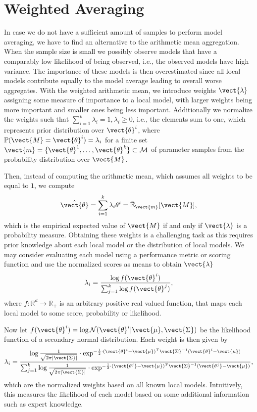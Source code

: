 \section{Weighted Averaging}
In case we do not have a sufficient amount of samples to perform model averaging, we have to find an alternative to the arithmetic mean aggregation. 
When the sample size is small we possibly observe models that have a comparably low likelihood of being observed, i.e., the observed models have high variance. 
The importance of these models is then overestimated since all local models contribute equally to the model average leading to overall worse aggregates.
With the weighted arithmetic mean, we introduce weights $\vect{\lambda}$ assigning some measure of importance to a local model, with larger weights being more important and smaller ones being less important.
Additionally we normalize the weights such that $\sum_{i=1}^k \lambda_i = 1, \lambda_i \geq 0$, i.e., the elements sum to one, which represents prior distribution over $\vect{\theta}^i$, where $\mathbb{P}(\vect{M} = \vect{\theta}^i) = \lambda_i$ for a finite set $\vect{m} = \{\vect{\theta}^1, \ldots, \vect{\theta}^k\} \subset \mathcal{M}$ of parameter samples from the probability distribution over $\vect{M}$.

Then, instead of computing the arithmetic mean, which assumes all weights to be equal to $1$, we compute
\begin{equation}
     \hat{\vect{\theta}} = \sum_{i=1}^k \lambda_i \theta^i = \tilde{\mathbb{E}}_{\vect{m}}[\vect{M}],
\end{equation}
which is the empirical expected value of $\vect{M}$ if and only if $\vect{\lambda}$ is a probability measure.
Obtaining these weights is a challenging task as this requires prior knowledge about each local model or the distribution of local models.
We may consider evaluating each model using a performance metric or scoring function and use the normalized scores as means to obtain $\vect{\lambda}$
\begin{equation}
    \lambda_i = \frac{\log f(\vect{\theta}^i)}{\sum_{j=1}^k \log f(\vect{\theta}^j)},
\end{equation}
where $f: \mathbb{R}^d \rightarrow \mathbb{R}_+$ is an arbitrary positive real valued function, that maps each local model to some score, probability or likelihood.

Now let $f(\vect{\theta}^i) = \log \mathcal{N}(\vect{\theta}^i \lvert \vect{\mu}, \vect{\Sigma})$ be the likelihood function of a secondary normal distribution.
Each weight is then given by
\begin{equation}
    \label{eq:normll}
    \lambda_i = \frac{\log \frac{1}{\sqrt{2\pi\lvert \vect{\Sigma} \rvert}} \cdot \exp^{-\frac{1}{2} \cdot (\vect{\theta}^i - \vect{\mu})^T\vect{\Sigma}^{-1}(\vect{\theta}^i - \vect{\mu})}}{\sum_{j=1}^k \log \frac{1}{\sqrt{2\pi\lvert \vect{\Sigma} \rvert}} \cdot \exp^{-\frac{1}{2} \cdot (\vect{\theta^j} - \vect{\mu})^T\vect{\Sigma}^{-1}(\vect{\theta^j} - \vect{\mu})}},
\end{equation}
which are the normalized weights based on all known local models.
Intuitively, this measures the likelihood of each model based on some additional information such as expert knowledge.

